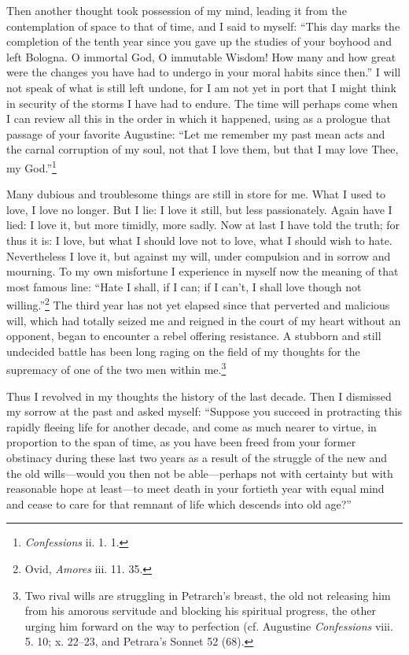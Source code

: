 Then another thought took possession of my mind, leading it from the
contemplation of space to that of time, and I said to myself: ``This
day marks the completion of the tenth year since you gave up the
studies of your boyhood and left Bologna. O immortal God, O immutable
Wisdom! How many and how great were the changes you have had to
undergo in your moral habits since then.'' I will not speak of what is
still left undone, for I am not yet in port that I might think in
security of the storms I have had to endure. The time will perhaps
come when I can review all this in the order in which it happened,
using as a prologue that passage of your favorite Augustine: ``Let me
remember my past mean acts and the carnal corruption of my soul, not
that I love them, but that I may love Thee, my
God.''\footnote{\textit{Confessions} ii. 1. 1.}

Many dubious and troublesome things are still in store for me. What I
used to love, I love no longer. But I lie: I love it still, but less
passionately. Again have I lied: I love it, but more timidly, more
sadly. Now at last I have told the truth; for thus it is: I love, but
what I should love not to love, what I should wish to hate.
Nevertheless I love it, but against my will, under compulsion and in
sorrow and mourning. To my own misfortune I experience in myself now
the meaning of that most famous line: ``Hate I shall, if I can; if I
can't, I shall love though not willing.''\footnote{Ovid,
\textit{Amores} iii. 11. 35.} The third year has not yet elapsed since
that perverted and malicious will, which had totally seized me and
 reigned in the court of my heart without an opponent, began
to encounter a rebel offering resistance. A stubborn and still
undecided battle has been long raging on the field of my thoughts for
the supremacy of one of the two men within me.\footnote{Two rival
wills are struggling in Petrarch's breast, the old not releasing him
from his amorous servitude and blocking his spiritual progress, the
other urging him forward on the way to perfection (cf. Augustine
\textit{Confessions} viii. 5. 10; x. 22--23, and Petrara's Sonnet 52
(68).}

Thus I revolved in my thoughts the history of the last decade. Then I
dismissed my sorrow at the past and asked myself: ``Suppose you
succeed in protracting this rapidly fleeing life for another decade,
and come as much nearer to virtue, in proportion to the span of time,
as you have been freed from your former obstinacy during these last
two years as a result of the struggle of the new and the old
wills---would you then not be able---perhaps not with certainty but
with reasonable hope at least---to meet death in your fortieth year
with equal mind and cease to care for that remnant of life which
descends into old age?''


